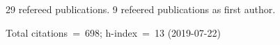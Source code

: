 29 refereed publications. 9 refeered publications as first author.

Total citations~=~698; h-index~=~13 (2019-07-22)